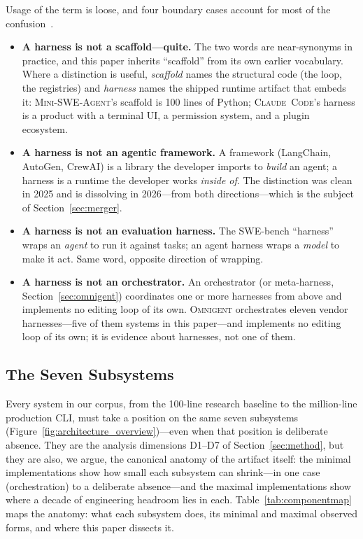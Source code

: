 \documentclass[11pt,a4paper]{article}
\newcommand{\clcode}{\textsc{Claude~Code}\xspace}
\newcommand{\mswe}{\textsc{Mini-SWE-Agent}\xspace}
\newcommand{\omni}{\textsc{Omnigent}\xspace}
\begin{document}
Usage of the term is loose, and four boundary cases account for most of the confusion~\cite{macedo2026}.

\begin{itemize}[itemsep=2pt]
  \item \textbf{A harness is not a scaffold---quite.} The two words are near-synonyms in practice, and this paper inherits ``scaffold'' from its own earlier vocabulary. Where a distinction is useful, \emph{scaffold} names the structural code (the loop, the registries) and \emph{harness} names the shipped runtime artifact that embeds it: \mswe{}'s scaffold is 100 lines of Python; \clcode{}'s harness is a product with a terminal UI, a permission system, and a plugin ecosystem.
  \item \textbf{A harness is not an agentic framework.} A framework (LangChain, AutoGen, CrewAI) is a library the developer imports to \emph{build} an agent; a harness is a runtime the developer works \emph{inside of}. The distinction was clean in 2025 and is dissolving in 2026---from both directions---which is the subject of Section~\ref{sec:merger}.
  \item \textbf{A harness is not an evaluation harness.} The SWE-bench ``harness'' wraps an \emph{agent} to run it against tasks; an agent harness wraps a \emph{model} to make it act. Same word, opposite direction of wrapping.
  \item \textbf{A harness is not an orchestrator.} An orchestrator (or meta-harness, Section~\ref{sec:omnigent}) coordinates one or more harnesses from above and implements no editing loop of its own. \omni{} orchestrates eleven vendor harnesses---five of them systems in this paper---and implements no editing loop of its own; it is evidence about harnesses, not one of them.
\end{itemize}

\subsection{The Seven Subsystems}
\label{sec:subsystems}

Every system in our corpus, from the 100-line research baseline to the million-line production CLI, must take a position on the same seven subsystems (Figure~\ref{fig:architecture_overview})---even when that position is deliberate absence.
They are the analysis dimensions D1--D7 of Section~\ref{sec:method}, but they are also, we argue, the canonical anatomy of the artifact itself: the minimal implementations show how small each subsystem can shrink---in one case (orchestration) to a deliberate absence---and the maximal implementations show where a decade of engineering headroom lies in each.
Table~\ref{tab:componentmap} maps the anatomy: what each subsystem does, its minimal and maximal observed forms, and where this paper dissects it.
\end{document}
